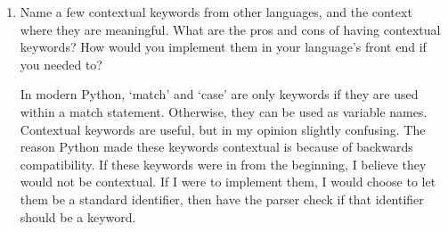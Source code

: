 \documentclass{article}
\begin{document}
\begin{enumerate}
    \item {
        Name a few contextual keywords from other languages, and the context where they are meaningful. What are the pros and cons of having contextual keywords? How would you implement them in your language’s front end if you needed to?

        In modern Python, `match' and `case' are only keywords if they are used 
        within a match statement. Otherwise, they can be used as variable names.
        Contextual keywords are useful, but in my opinion slightly confusing. 
        The reason Python made these keywords contextual is because of backwards
        compatibility. If these keywords were in from the beginning, I believe 
        they would not be contextual. If I were to implement them, I would choose 
        to let them be a standard identifier, then have the parser check if that 
        identifier should be a keyword.
    }
\end{enumerate}
\end{document}

